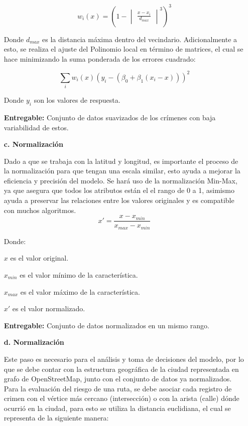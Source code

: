 \begin{itemize}
\begin{equation} 
	w_{i}(x)=(1-\begin{vmatrix}
		\frac{x-x_{i}}{d_{max}}
	\end{vmatrix}^{3})^{3}
\end{equation}

Donde $d_{max}$ es la distancia máxima dentro del vecindario.
Adicionalmente a esto, se realiza el ajuste del Polinomio local en término de matrices, el cual se hace minimizando la suma ponderada de los errores cuadrado:

\begin{equation} 
	\sum_{i}w_{i}(x)(y_{i}-(\beta _{0}+\beta _{1}(x_{i}-x)))^{2}
\end{equation}

Donde $y_{i}$ son los valores de respuesta.

\textbf{Entregable:} Conjunto de datos suavizados de los crímenes con baja variabilidad de estos.

	\item[\textbf{c. Normalización}]\medskip

Dado a que se trabaja con la latitud y longitud, es importante el proceso de la normalización para que tengan una escala similar, esto ayuda a mejorar la eficiencia y precisión del modelo. Se hará uso de la normalización Min-Max, ya que asegura que todos los atributos están el el rango de 0 a 1, asimismo ayuda a preservar las relaciones entre los valores originales y es compatible con muchos algoritmos\parencite{gl_med}. 
	\begin{equation} 
		{x}'=\frac{x-x_{min}}{x_{max}-x_{min}}
	\end{equation}

Donde:

$x$ es el valor original.

$x_{min}$ es el valor mínimo de la característica.

$x_{max}$ es el valor máximo de la característica.

${x}'$ es el valor normalizado.

\textbf{Entregable:} Conjunto de datos normalizados en un mismo rango.
	
	\item[\textbf{d. Normalización}]
	
Este paso es necesario para el análisis y toma de decisiones del modelo, por lo que se debe contar con la estructura geográfica de la ciudad representada en grafo de OpenStreetMap, junto con el conjunto de datos ya normalizados. Para la evaluación del riesgo de una ruta, se debe asociar cada registro de crimen con el vértice más cercano (intersección) o con la arista (calle) dónde ocurrió en la ciudad, para esto se utiliza la distancia euclidiana, el cual se representa de la siguiente manera:


\end{itemize}
